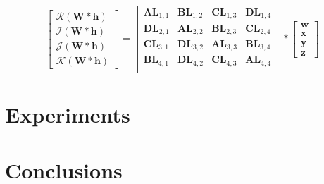 \documentclass[14pt,a4paper]{article}
\begin{document}
\begin{equation}
\begin{bmatrix}
 \mathscr{R}(\textbf{W}\ast \textbf{h}) \\ 
 \mathscr{I}(\textbf{W}\ast \textbf{h}) \\
 \mathscr{J}(\textbf{W}\ast \textbf{h}) \\
 \mathscr{K}(\textbf{W}\ast \textbf{h}) 
\end{bmatrix}
=
\begin{bmatrix}
 \textbf{A}\textbf{L$_{1,1}$} & \textbf{B}\textbf{L$_{1,2}$} & \textbf{C}\textbf{L$_{1,3}$} & \textbf{D}\textbf{L$_{1,4}$} \\
 \textbf{D}\textbf{L$_{2,1}$} & \textbf{A}\textbf{L$_{2,2}$} & \textbf{B}\textbf{L$_{2,3}$} & \textbf{C}\textbf{L$_{2,4}$} \\
 \textbf{C}\textbf{L$_{3,1}$} & \textbf{D}\textbf{L$_{3,2}$} & \textbf{A}\textbf{L$_{3,3}$} & \textbf{B}\textbf{L$_{3,4}$} \\
 \textbf{B}\textbf{L$_{4,1}$} & \textbf{D}\textbf{L$_{4,2}$} & \textbf{C}\textbf{L$_{4,3}$} & \textbf{A}\textbf{L$_{4,4}$} \\
\end{bmatrix}
\ast
\begin{bmatrix}
 \textbf{w} \\ 
 \textbf{x} \\
 \textbf{y} \\
 \textbf{z}
\end{bmatrix}
\label{eq:quatconv}
\end{equation}


\section{Experiments}


\section{Conclusions}
\end{document}
